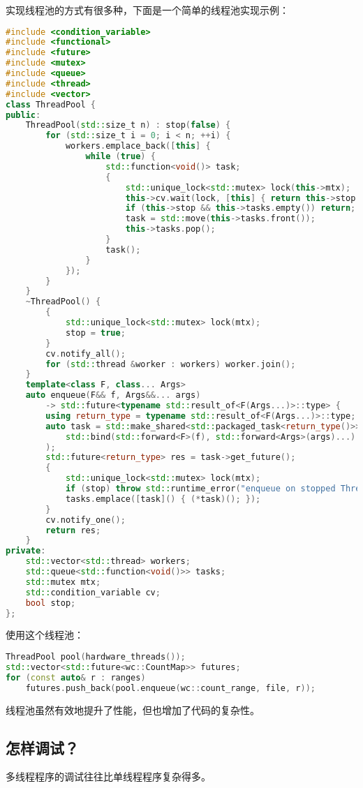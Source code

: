 实现线程池的方式有很多种，下面是一个简单的线程池实现示例：
\begin{lstlisting}[language=C++]
#include <condition_variable>
#include <functional>
#include <future>
#include <mutex>
#include <queue>
#include <thread>
#include <vector>
class ThreadPool {
public:
    ThreadPool(std::size_t n) : stop(false) {
        for (std::size_t i = 0; i < n; ++i) {
            workers.emplace_back([this] {
                while (true) {
                    std::function<void()> task;
                    {
                        std::unique_lock<std::mutex> lock(this->mtx);
                        this->cv.wait(lock, [this] { return this->stop || !this->tasks.empty(); });
                        if (this->stop && this->tasks.empty()) return;
                        task = std::move(this->tasks.front());
                        this->tasks.pop();
                    }
                    task();
                }
            });
        }
    }
    ~ThreadPool() {
        {
            std::unique_lock<std::mutex> lock(mtx);
            stop = true;
        }
        cv.notify_all();
        for (std::thread &worker : workers) worker.join();
    }
    template<class F, class... Args>
    auto enqueue(F&& f, Args&&... args)
        -> std::future<typename std::result_of<F(Args...)>::type> {
        using return_type = typename std::result_of<F(Args...)>::type;
        auto task = std::make_shared<std::packaged_task<return_type()>>(
            std::bind(std::forward<F>(f), std::forward<Args>(args)...)
        );
        std::future<return_type> res = task->get_future();
        {
            std::unique_lock<std::mutex> lock(mtx);
            if (stop) throw std::runtime_error("enqueue on stopped ThreadPool");
            tasks.emplace([task]() { (*task)(); });
        }
        cv.notify_one();
        return res;
    }
private:
    std::vector<std::thread> workers;
    std::queue<std::function<void()>> tasks;
    std::mutex mtx;
    std::condition_variable cv;
    bool stop;
};
\end{lstlisting}
使用这个线程池：
\begin{lstlisting}[language=C++]
ThreadPool pool(hardware_threads());
std::vector<std::future<wc::CountMap>> futures;
for (const auto& r : ranges)
    futures.push_back(pool.enqueue(wc::count_range, file, r));
\end{lstlisting}

线程池虽然有效地提升了性能，但也增加了代码的复杂性。

\subsection{怎样调试？}
多线程程序的调试往往比单线程程序复杂得多。

